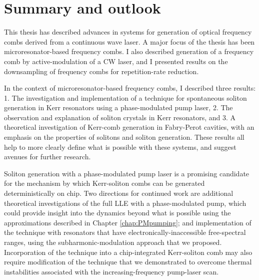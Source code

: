  \chapter{Summary and outlook}\label{chap:conclusion}

This thesis has described advances in systems for generation of optical frequency combs derived from a continuous wave laser. A major focus of the thesis has been microresonator-based frequency combs. I also described generation of a frequency comb by active-modulation of a CW laser, and I presented results on the downsampling of frequency combs for repetition-rate reduction.

In the context of microresonator-based frequency combs, I described three results: 1. The investigation and implementation of a technique for spontaneous soliton generation in Kerr resonators using a phase-modulated pump laser, 2. The observation and explanation of soliton crystals in Kerr resonators, and 3. A theoretical investigation of Kerr-comb generation in Fabry-Perot cavities, with an emphasis on the properties of solitons and soliton generation. These results all help to more clearly define what is possible with these systems, and suggest avenues for further research. 

Soliton generation with a phase-modulated pump laser is a promising candidate for the mechanism by which Kerr-soliton combs can be generated deterministically on chip. Two directions for continued work are additional theoretical investigations of the full LLE with a phase-modulated pump, which could provide insight into the dynamics beyond what is possible using the approximations described in Chapter \ref{chap:PMpumping}; and implementation of the technique with resonators that have electronically-inaccessible free-spectral ranges, using the subharmonic-modulation approach that we proposed. Incorporation of the technique into a chip-integrated Kerr-soliton comb may also require modification of the technique that we demonstrated to overcome thermal instabilities associated with the increasing-frequency pump-laser scan.

